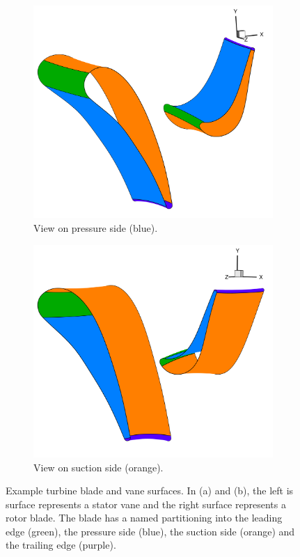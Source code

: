 \documentclass[a4paper, 11pt]{report}
\theoremstyle{definition}
\begin{document}
	\begin{figure}[H]
		\centering
		\begin{subfigure}{.49\textwidth}
			\includegraphics[width=\textwidth]{../tec/rotor_stator/11.png}
			\caption{View on pressure side (blue).}
		\end{subfigure}
		\begin{subfigure}{.49\textwidth}
			\includegraphics[width=\textwidth]{../tec/rotor_stator/12.png}
			\caption{View on suction side (orange).}
		\end{subfigure}
		\caption{Example turbine blade and vane surfaces. In (a) and (b), the left is surface represents a stator vane and the right surface represents a rotor blade. The blade has a named partitioning into the leading edge (green), the pressure side (blue), the suction side (orange) and the trailing edge (purple).}
		\label{fig:rotor_stator}
	\end{figure}
\end{document}
